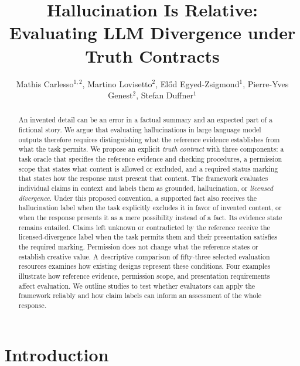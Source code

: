 \documentclass{clv2025}
\title{Hallucination Is Relative:
Evaluating LLM Divergence under Truth Contracts}
\author{Mathis Carlesso$^{1,2}$, Martino Lovisetto$^{2}$, El\H{o}d Egyed-Zsigmond$^{1}$, Pierre-Yves Genest$^{2}$, Stefan Duffner$^{1}$}
\affil{INSA Lyon, CNRS, LIRIS, UMR5205, Universit\'e Claude Bernard Lyon 1, 69621 Villeurbanne, France\\
  \quad \email{mathis.carlesso@insa-lyon.fr}}
\affil{Alteca, 69100 Villeurbanne, France}
\begin{document}
\maketitle


\begin{abstract}
An invented detail can be an error in a factual summary and an expected
part of a fictional story. We argue that evaluating hallucinations in
large language model outputs therefore requires distinguishing what the
reference evidence establishes from what the task permits. We propose an
explicit \emph{truth contract} with three components: a task oracle that
specifies the reference evidence and checking procedures, a permission
scope that states what content is allowed or excluded, and a required status
marking that states how the response must present that content.
The framework evaluates individual claims in context and labels them as
grounded, hallucination, or \emph{licensed divergence}. Under this proposed
convention, a supported fact also receives the hallucination label when
the task explicitly excludes it in favor of invented content, or when the
response presents it as a mere possibility instead of a fact. Its evidence
state remains entailed. Claims left unknown
or contradicted by the reference receive the licensed-divergence label
when the task permits them and their presentation satisfies the required
marking. Permission does not change what the reference states or
establish creative value. A descriptive comparison of fifty-three selected
evaluation resources examines how existing designs represent these
conditions. Four examples illustrate how reference evidence, permission scope,
and presentation requirements affect evaluation. We outline
studies to test whether evaluators can apply the framework reliably and
how claim labels can inform an assessment of the whole response.
\end{abstract}

\section{Introduction}\label{sec:intro}
\end{document}
